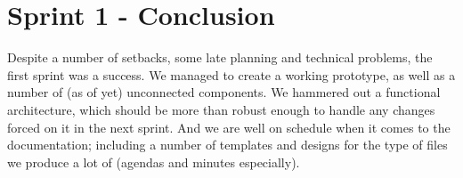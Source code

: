 \section{Sprint 1 - Conclusion}

Despite a number of setbacks, some late planning and technical problems, the first sprint was a success. We managed to create a working prototype, as well as a number of (as of yet) unconnected components. We hammered out a functional architecture, which should be more than robust enough to handle any changes forced on it in the next sprint. And we are well on schedule when it comes to the documentation; including a number of templates and designs for the type of files we produce a lot of (agendas and minutes especially). 